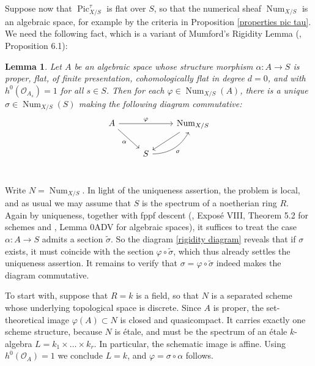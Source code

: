 \documentclass[oneside, 12pt]{amsart}
\newcommand\mylabel[1]{\label{#1}\marginpar{\raggedright\vspace{-1ex}\medskip\medskip\footnotesize \tt #1}}
\renewcommand\mylabel[1]{\label{#1}}
\newtheorem{lemma}[theorem]{Lemma}
\theoremstyle{definition}
\theoremstyle{remark}
\newcommand{\Num}{\operatorname{Num}}
\renewcommand{\O}{\mathscr{O}}
\newcommand{\Pic}{\operatorname{Pic}}
\newcommand{\ra}{\rightarrow}
\begin{document}
\medskip
%
Suppose now  that $\Pic^\tau_{X/S}$ is flat over $S$, so that the numerical sheaf $\Num_{X/S}$ is an algebraic space,
for example by the criteria  in Proposition \ref{properties pic tau}.
We need the following fact, which is a variant  of Mumford's Rigidity Lemma (\cite{Mumford; Fogarty; Kirwan 1993}, Proposition 6.1):

\begin{lemma}
\mylabel{rigidity}
Let $A$ be an algebraic space whose structure morphism $\alpha:A\ra S$ is proper, flat, of finite presentation,
cohomologically flat in degree $d=0$, and with $h^0(\O_{A_s})=1$ for all $s\in S$.
Then for each   $\varphi\in\Num_{X/S}(A)$, there is a unique $\sigma\in \Num_{X/S}(S)$ making the following diagram commutative:
\begin{equation}
\label{rigidity diagram}
\begin{tikzcd} 
A\ar[dr,"\alpha"']\ar[rr,"\varphi"]      &       & \Num_{X/S}\ar[dl]\\
        & S\ar[ur, bend right=30, "\sigma"']\\ 
\end{tikzcd}
\end{equation} 
\end{lemma}

\proof
Write $N=\Num_{X/S}$.
In light of the uniqueness assertion, the problem is local, and as usual we   may assume that $S$ is the spectrum
of a noetherian ring $R$.  Again by uniqueness, together with fppf descent 
(\cite{SGA 1}, Expos\'e VIII, Theorem 5.2 for schemes and \cite{SP}, 
Lemma 0ADV for algebraic spaces),
it suffices to treat the case $\alpha:A\ra S$ admits a section $\tilde{\sigma}$. 
So  the diagram \eqref{rigidity diagram} reveals that if $\sigma$ exists, it must coincide with the section $\varphi\circ\tilde{\sigma}$,
which thus already settles the uniqueness assertion. It remains to verify that $\sigma=\varphi\circ\tilde{\sigma}$
indeed makes the diagram commutative.

To start with, suppose that $R=k$ is a field, so that $N$ is a separated scheme whose underlying topological space is discrete.  Since $A$ is proper,
the set-theoretical image $\varphi(A)\subset N$ is closed and quasicompact. It carries exactly one scheme structure,
because $N$ is \'etale, and must be  the spectrum of an \'etale $k$-algebra $L=k_1\times\ldots\times k_r$.
In particular, the schematic image is affine. Using $h^0(\O_A)=1$ we conclude $L=k$, and $\varphi=\sigma\circ \alpha $ follows.
\end{document}
